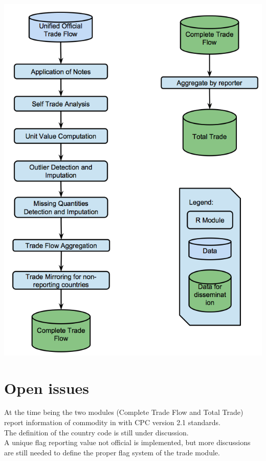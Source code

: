 \documentclass[nojss]{jss}\usepackage[]{graphicx}\usepackage[]{color}
\begin{document}
\begin{center}\includegraphics[scale = 0.01]{"trade_1_bis"}\end{center}


\section{Open issues}
At the time being the two modules (Complete Trade Flow and Total Trade) report information of commodity in with CPC version 2.1 standards.\\
The definition of the country code is still under discussion.\\
A unique flag reporting value not official is implemented, but more discussions are still needed to define the proper flag system of the trade module.
\newpage
\end{document}
